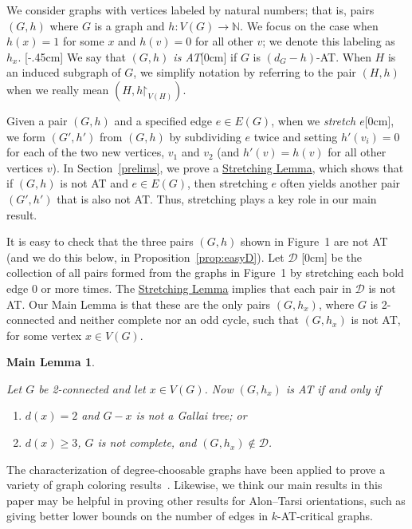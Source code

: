 \documentclass[12pt]{article}
\theoremstyle{plain}
\newtheorem*{mainthm}{Main Lemma}
\theoremstyle{definition}
\theoremstyle{remark}
\newcommand{\fancy}[1]{\mathcal{#1}}
\newcommand{\IN}{\mathbb{N}}
\newcommand{\D}{\fancy{D}}
\newcommand{\func}[3]{#1\colon #2 \rightarrow #3}
\newcommand{\parens}[1]{\left( #1 \right)}
\def\D{\fancy{D}}
\renewcommand{\restriction}{\mathord{\upharpoonright}}
\newcommand{\aside}[1]{\marginnote{\scriptsize{#1}}[0cm]}
\newcommand{\aaside}[2]{\marginnote{\scriptsize{#1}}[#2]}
\begin{document}
	\bigskip
	
	We consider graphs with vertices labeled by natural numbers; that is, pairs
	$(G,h)$ where $G$ is a graph and $\func{h}{V(G)}{\IN}$.  We focus on the case
	when $h(x)=1$ for some $x$ and $h(v)=0$ for all other $v$; we denote this
	labeling as $h_x$. \aaside{$h_x$}{-.45cm}  We say that \emph{$(G, h)$ is
		AT}\aside{$(G,h)$\\ is AT} if $G$ is $(d_G - h)$-AT.
	When $H$ is an induced subgraph of $G$, we simplify notation by referring to
	the pair $(H, h)$ when we really mean $\parens{H, h\restriction_{V(H)}}$.
	
	Given a pair $(G,h)$ and a specified edge $e\in E(G)$, when we \emph{stretch
		$e$}\aside{stretch $e$}, we form $(G',h')$ from $(G,h)$ by subdividing $e$ twice and setting
	$h'(v_i)=0$ for each of the two new vertices, $v_1$ and $v_2$ (and $h'(v)=h(v)$
	for all other vertices $v$).  In Section~\ref{prelims}, we prove a
	\hyperlink{target:SubdivideTwice}{Stretching Lemma}, which shows that if $(G,h)$ is not
	AT and $e\in E(G)$, then stretching $e$ often yields another pair $(G',h')$
	that is also not AT.  Thus, stretching plays a key role in our main result.
	
	It is easy to check that the three pairs $(G,h)$ shown in Figure~1 are not AT
	(and we do this below, in Proposition~\ref{prop:easyD}).  Let $\D$ \aside{$\D$} be the
	collection of all pairs formed from the graphs in Figure~1 by stretching each
	bold edge 0 or more times.  The \hyperlink{target:SubdivideTwice}{Stretching Lemma}
	implies that each pair in $\D$ is not AT.  Our Main Lemma is that these are
	the only pairs $(G,h_x)$, where $G$ is 2-connected and neither complete 
	nor an odd cycle, such that $(G,h_x)$ is not AT, for some vertex $x\in V(G)$.  
	
	\begin{mainthm}
		\hypertarget{target:mainLemma}{}
		Let $G$ be 2-connected and let $x \in V(G)$.
		Now $(G,h_x)$ is AT if and only if
		\begin{enumerate}
			\item[(1)] $d(x)=2$ and $G-x$ is not a Gallai tree; or
			\item[(2)] $d(x)\ge 3$, $G$ is not complete, and $(G,h_x) \not \in \D$.
		\end{enumerate}
	\end{mainthm}
	
	The characterization of degree-choosable graphs have been applied
	to prove a variety of graph coloring
	results~\cite{BohmeMS, CranstonPTV, KostochkaS, KralS, Thomassen-surface}. 
	Likewise, we think our main results in this paper may be helpful in proving
	other results for Alon--Tarsi orientations, such as giving better lower bounds
	on the number of edges in $k$-AT-critical graphs.
	\bigskip
	
\end{document}
